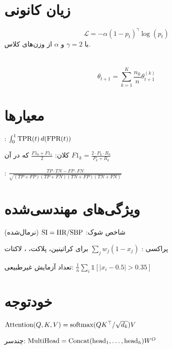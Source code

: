\section{زیان کانونی}

\begin{equation}
\mathcal{L} = -\alpha (1-p_t)^\gamma \log(p_t)
\end{equation}
با $\gamma = 2$ و $\alpha$ از وزن‌های کلاس.

\section{}

\begin{equation}
\theta_{t+1} = \sum_{k=1}^{K} \frac{n_k}{n} \theta_{t+1}^{(k)}
\end{equation}

\section{معیارها}

: $\int_0^1 \text{TPR}(t) \, d(\text{FPR}(t))$

 کلان: $\frac{F1_0 + F1_1}{2}$ که در آن $F1_k = \frac{2 \cdot P_k \cdot R_k}{P_k + R_k}$

: $\frac{TP \cdot TN - FP \cdot FN}{\sqrt{(TP+FP)(TP+FN)(TN+FP)(TN+FN)}}$

\section{ویژگی‌های مهندسی‌شده}

شاخص شوک: $\text{SI} = \text{HR} / \text{SBP}$ (نرمال‌شده)

پراکسی : $\sum_{j} w_j (1 - x_j)$ برای کراتینین، پلاکت، ، لاکتات

تعداد آزمایش غیرطبیعی: $\frac{1}{n} \sum_{i} \mathbb{1}[|x_i - 0.5| > 0.35]$

\section{خودتوجه}

$\text{Attention}(Q,K,V) = \text{softmax}(QK^\top / \sqrt{d_k}) V$

چندسر: $\text{MultiHead} = \text{Concat}(\text{head}_1, \ldots, \text{head}_h) W^O$
